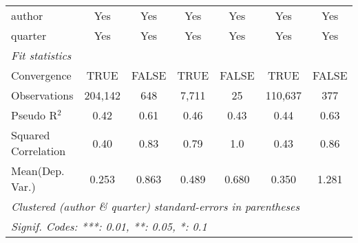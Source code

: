 \begin{tabular}{lcccccc}
   author                                                     & Yes           & Yes           & Yes           & Yes           & Yes           & Yes\\  
   quarter                                                    & Yes           & Yes           & Yes           & Yes           & Yes           & Yes\\  
   \midrule
   \emph{Fit statistics}\\
   Convergence                                                &TRUE           & FALSE         & TRUE          & FALSE         & TRUE          & FALSE\\  
   Observations                                               & 204,142       & 648           & 7,711         & 25            & 110,637       & 377\\  
   Pseudo R$^2$                                               & 0.42          & 0.61          & 0.46          & 0.43          & 0.44          & 0.63\\  
   Squared Correlation                                        & 0.40          & 0.83          & 0.79          & 1.0           & 0.43          & 0.86\\  
Mean(Dep. Var.) & 0.253 & 0.863 & 0.489 & 0.680 & 0.350 & 1.281 \\
   \midrule \midrule
   \multicolumn{7}{l}{\emph{Clustered (author \& quarter) standard-errors in parentheses}}\\
   \multicolumn{7}{l}{\emph{Signif. Codes: ***: 0.01, **: 0.05, *: 0.1}}\\
\end{tabular}
\par\endgroup
